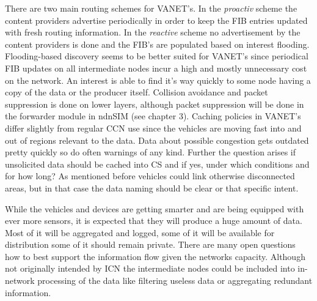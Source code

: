 There are two main routing schemes for VANET's. In the \emph{proactiv} scheme the content providers advertise periodically in order to keep the FIB entries updated with fresh routing information. In the \emph{reactive} scheme no advertisement by the content providers is done and the FIB's are populated based on interest flooding. Flooding-based discovery seems to be better suited for VANET's since periodical FIB updates on all intermediate nodes incur a high and mostly unnecessary cost on the network. An interest is able to find it's way quickly to some node having a copy of the data or the producer itself. Collision avoidance and packet suppression is done on lower layers, although packet suppression will be done in the forwarder module in ndnSIM (see chapter 3).
Caching policies in VANET's differ slightly from regular CCN use since the vehicles are moving fast into and out of regions relevant to the data. Data about possible congestion gets outdated pretty quickly so do often warnings of any kind. Further the question arises if unsolicited data should be cached into CS and if yes, under which conditions and for how long? As mentioned before vehicles could link otherwise disconnected areas, but in that case the data naming should be clear or that specific intent.

While the vehicles and devices are getting smarter and are being equipped with ever more sensors, it is expected that they will produce a huge amount of data. Most of it will be aggregated and logged, some of it will be available for distribution some of it should remain private. There are many open questions how to best support the information flow given the networks capacity. Although not originally intended by ICN the intermediate nodes could be included into in-network processing of the data like filtering useless data or aggregating redundant information.








